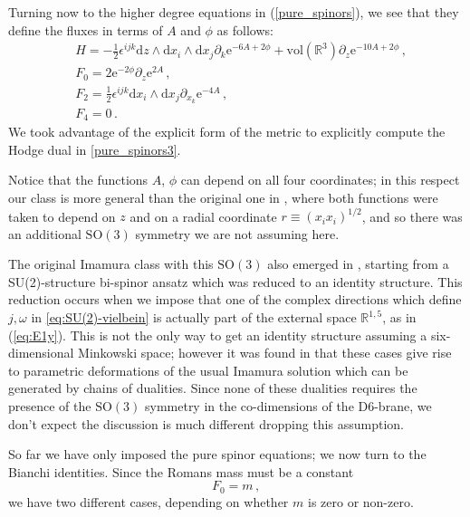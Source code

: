 \documentclass[12pt]{article}
\newcommand{\R}{\mathbb{R}}
\newcommand{\dd}{\mathrm{d}}
\newcommand{\e}{\mathrm{e}}
\newcommand{\vol}{\mathrm{vol}}
\begin{document}
Turning now to the higher degree equations in (\ref{pure_spinors}), we see that they define the fluxes in terms of $A$ and $\phi$ as follows:
\begin{subequations}
\label{Imamura_fluxes}
\begin{align}
&H= - \frac{1}{2} \epsilon^{ijk} \dd z \wedge \dd x_i \wedge \dd x_j \partial_k \e^{-6A+2\phi} + \vol(\R^3)  \partial_z \e^{-10 A+2\phi} \, , \label{Imamura_fluxesH} \\
&F_0 =2 \e^{-2 \phi } \partial_{z} \e^{2 A} \label{eq:Imamura-F0} \, ,\\
&F_2 =  \frac{1}{2} \epsilon^{ijk} \dd x_i \wedge \dd x_j \partial_{x_k} \e^{-4A} \, , \label{eq:Imamura-F2}\\
&F_4=0 \, . \label{eq:Imamura-F4}
\end{align}
\end{subequations}
We took advantage of the explicit form of the metric to explicitly compute the Hodge dual in \eqref{pure_spinors3}.

Notice that the functions $A$, $\phi$ can depend on all four coordinates; in this respect our class is more general than the original one in \cite{imamura}, where both functions were taken to depend on $z$ and on a radial coordinate $r\equiv (x_i x_i)^{1/2}$, and so there was an additional $\mathrm{SO}(3)$ symmetry we are not assuming here.

The original Imamura class with this $\mathrm{SO}(3)$ also emerged in \cite[section 4.1]{macpherson-t}, starting from a SU(2)-structure bi-spinor ansatz which was reduced to an identity structure. This reduction occurs when we impose that one of the complex directions which define $j,\omega$ in \eqref{eq:SU(2)-vielbein} is actually part of the external space $\R^{1,5}$, as in (\ref{eq:E1y}). This is not the only way to get an identity structure assuming a six-dimensional Minkowski space; however it was found in \cite{l-macpherson} that these cases give rise to parametric deformations of the usual Imamura solution which can be generated by chains of dualities. Since none of these dualities requires the presence of the $\mathrm{SO}(3)$ symmetry in the co-dimensions of the D6-brane, we don't expect the discussion is much different dropping this assumption.

So far we have only imposed the pure spinor equations; we now turn to the Bianchi identities. Since the Romans mass must be a constant 
\begin{equation}
	F_0=m\,,
\end{equation}
we have two different cases, depending on whether $m$ is zero or non-zero.
\end{document}
